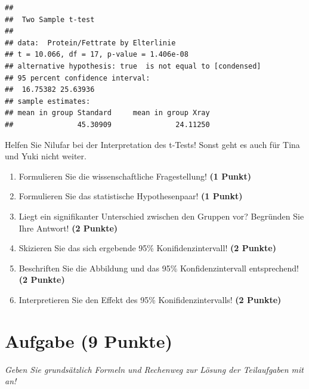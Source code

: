 \documentclass[a4paper, 9pt]{scrartcl}\usepackage[]{graphicx}\usepackage[]{xcolor}
\makeatletter
\newenvironment{kframe}{%
 \def\at@end@of@kframe{}%
 \ifinner\ifhmode%
  \def\at@end@of@kframe{\end{minipage}}%
  \begin{minipage}{\columnwidth}%
 \fi\fi%
 \def\FrameCommand##1{\hskip\@totalleftmargin \hskip-\fboxsep
 \colorbox{shadecolor}{##1}\hskip-\fboxsep
     \hskip-\linewidth \hskip-\@totalleftmargin \hskip\columnwidth}%
 \MakeFramed {\advance\hsize-\width
   \@totalleftmargin\z@ \linewidth\hsize
   \@setminipage}}%
 {\par\unskip\endMakeFramed%
 \at@end@of@kframe}
\newenvironment{knitrout}{}{} %
\makeatother
\begin{document}
\begin{knitrout}
\color{fgcolor}\begin{kframe}
\begin{verbatim}
## 
## 	Two Sample t-test
## 
## data:  Protein/Fettrate by Elterlinie
## t = 10.066, df = 17, p-value = 1.406e-08
## alternative hypothesis: true  is not equal to [condensed]
## 95 percent confidence interval:
##  16.75382 25.63936
## sample estimates:
## mean in group Standard     mean in group Xray 
##               45.30909               24.11250
\end{verbatim}
\end{kframe}
\end{knitrout}

Helfen Sie Nilufar bei der Interpretation des t-Tests! Sonst geht es auch für Tina und Yuki nicht weiter.

\begin{enumerate}
  \item Formulieren Sie die wissenschaftliche Fragestellung! \textbf{(1 Punkt)}
  \item Formulieren Sie das statistische Hypothesenpaar! \textbf{(1 Punkt)}
\item Liegt ein signifikanter Unterschied zwischen den Gruppen vor? Begründen Sie Ihre Antwort! \textbf{(2 Punkte)}
\item Skizieren Sie das sich ergebende 95\% Konifidenzintervall! \textbf{(2 Punkte)}
\item Beschriften Sie die Abbildung und das 95\% Konfidenzintervall entsprechend! \textbf{(2 Punkte)}  
\item Interpretieren Sie den Effekt des 95\% Konifidenzintervalls! \textbf{(2 Punkte)}
\end{enumerate} 
\clearpage

\section{Aufgabe \hfill (9 Punkte)}

\textit{Geben Sie grundsätzlich Formeln und Rechenweg zur Lösung der Teilaufgaben mit an!} \\[1Ex]
 
\end{document}
